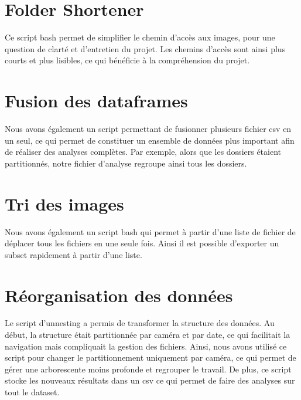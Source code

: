 \section{Folder Shortener}

Ce script bash permet de simplifier le chemin d'accès aux images, pour une question de clarté et d'entretien du projet. Les chemins d'accès sont ainsi plus courts et plus lisibles, ce qui bénéficie à la compréhension du projet.

\section{Fusion des dataframes}

Nous avons également un script permettant de fusionner plusieurs fichier csv en un seul, ce qui permet de constituer un ensemble de données plus important afin de réaliser des analyses complètes. Par exemple, alors que les dossiers étaient partitionnés, notre fichier d'analyse regroupe ainsi tous les dossiers.

\section{Tri des images}

Nous avons également un script bash qui permet à partir d'une liste de fichier de déplacer tous les fichiers en une seule fois. Ainsi il est possible d'exporter un subset rapidement à partir d'une liste.

\section{Réorganisation des données}

Le script d'unnesting a permis de transformer la structure des données. Au début, la structure était partitionnée par caméra et par date, ce qui facilitait la navigation mais compliquait la gestion des fichiers. Ainsi, nous avons utilisé ce script pour changer le partitionnement uniquement par caméra, ce qui permet de gérer une arborescente moins profonde et regrouper le travail. De plus, ce script stocke les nouveaux résultats dans un csv ce qui permet de faire des analyses sur tout le dataset.
